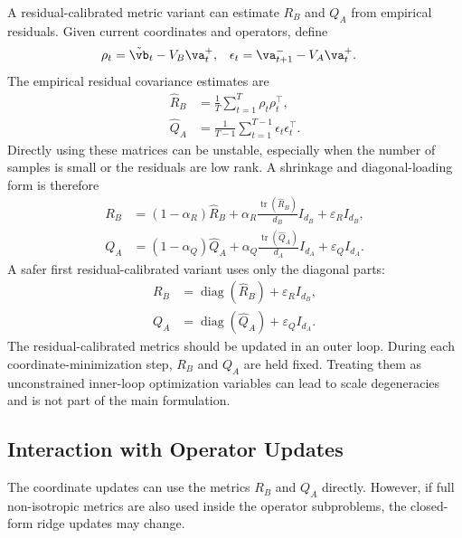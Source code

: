 \documentclass[twoside,11pt]{article}
\begin{document}
A residual-calibrated metric variant can estimate $R_B$ and $Q_A$ from
empirical residuals. Given current coordinates and operators, define
\begin{align}
\rho_t
&=
\tilde{\vb}_t - V_B\va_t^+,
&
\epsilon_t
&=
\va_{t+1}^- - V_A\va_t^+.
\label{eq:app_residuals_for_calibration}
\end{align}
The empirical residual covariance estimates are
\begin{align}
\widehat R_B
&=
\frac1T
\sum_{t=1}^T
\rho_t\rho_t^\top,
\label{eq:app_Rhat_full}
\\
\widehat Q_A
&=
\frac1{T-1}
\sum_{t=1}^{T-1}
\epsilon_t\epsilon_t^\top.
\label{eq:app_Qhat_full}
\end{align}
Directly using these matrices can be unstable, especially when the
number of samples is small or the residuals are low rank. A shrinkage
and diagonal-loading form is therefore
\begin{align}
R_B
&=
(1-\alpha_R)\widehat R_B
+
\alpha_R
\frac{\operatorname{tr}(\widehat R_B)}{d_B}
I_{d_B}
+
\varepsilon_R I_{d_B},
\label{eq:app_RB_shrinkage}
\\
Q_A
&=
(1-\alpha_Q)\widehat Q_A
+
\alpha_Q
\frac{\operatorname{tr}(\widehat Q_A)}{d_A}
I_{d_A}
+
\varepsilon_Q I_{d_A}.
\label{eq:app_QA_shrinkage}
\end{align}
A safer first residual-calibrated variant uses only the diagonal parts:
\begin{align}
R_B
&=
\operatorname{diag}(\widehat R_B)
+
\varepsilon_R I_{d_B},
\label{eq:app_RB_diagonal}
\\
Q_A
&=
\operatorname{diag}(\widehat Q_A)
+
\varepsilon_Q I_{d_A}.
\label{eq:app_QA_diagonal}
\end{align}
The residual-calibrated metrics should be updated in an outer loop.
During each coordinate-minimization step, $R_B$ and $Q_A$ are held
fixed. Treating them as unconstrained inner-loop optimization variables
can lead to scale degeneracies and is not part of the main formulation.

\subsection{Interaction with Operator Updates}

The coordinate updates can use the metrics $R_B$ and $Q_A$ directly.
However, if full non-isotropic metrics are also used inside the
operator subproblems, the closed-form ridge updates may change.
\end{document}
